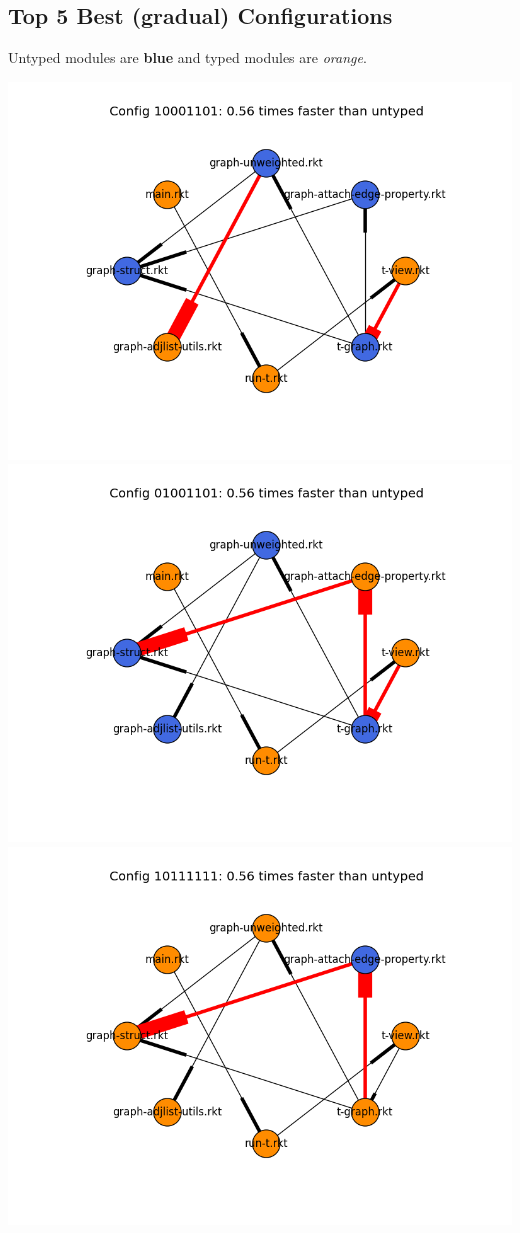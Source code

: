 \documentclass{article}
\begin{document}
\subsection{Top 5 Best (gradual) Configurations}
Untyped modules are \textbf{blue} and typed modules are \emph{orange}.

\includegraphics[width=\textwidth]{mbta+graph-2015-04-20-module-graph-10001101.png}
\includegraphics[width=\textwidth]{mbta+graph-2015-04-20-module-graph-01001101.png}
\includegraphics[width=\textwidth]{mbta+graph-2015-04-20-module-graph-10111111.png}
\end{document}
